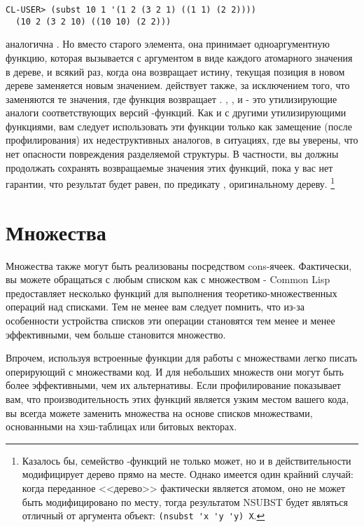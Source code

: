 \begin{lstlisting}[style=lisprepl]
  CL-USER> (subst 10 1 '(1 2 (3 2 1) ((1 1) (2 2))))
  (10 2 (3 2 10) ((10 10) (2 2)))
\end{lstlisting}

 аналогична . Но вместо старого элемента, она принимает
одноаргументную функцию, которая вызывается с аргументом в виде каждого атомарного
значения в дереве, и всякий раз, когда она возвращает истину, текущая позиция в новом
дереве заменяется новым значением.  действует также, за исключением
того, что заменяются те значения, где функция возвращает . ,
, и  - это утилизирующие аналоги соответствующих
версий -функций. Как и с другими утилизирующими функциями, вам следует
использовать эти функции только как замещение (после профилирования) их недеструктивных
аналогов, в ситуациях, где вы уверены, что нет опасности повреждения разделяемой
структуры. В частности, вы должны продолжать сохранять возвращаемые значения этих функций,
пока у вас нет гарантии, что результат будет равен, по предикату , оригинальному
дереву. \footnote{Казалось бы, семейство -функций не только может, но и в
  действительности модифицирует дерево прямо на месте. Однако имеется один крайний случай:
  когда переданное <<дерево>> фактически является атомом, оно не может быть модифицировано
  по месту, тогда результатом NSUBST будет являться отличный от аргумента объект:
  \lstinline!(nsubst 'x 'y 'y) X!.}

\section{Множества}

Множества также могут быть реализованы посредством cons-ячеек. Фактически, вы можете
обращаться с любым списком как с множеством - Common Lisp предоставляет несколько функций
для выполнения теоретико-множественных операций над списками. Тем не менее вам следует
помнить, что из-за особенности устройства списков эти операции становятся тем менее и
менее эффективными, чем больше становится множество.

Впрочем, используя встроенные функции для работы с множествами легко писать оперирующий с
множествами код. И для небольших множеств они могут быть более эффективными, чем их
альтернативы. Если профилирование показывает вам, что производительность этих функций
является узким местом вашего кода, вы всегда можете заменить множества на основе списков
множествами, основанными на хэш-таблицах или битовых векторах.

